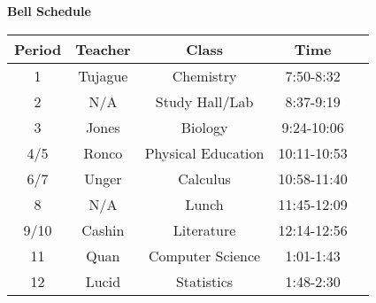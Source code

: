 \documentclass[44pt]{article}
\begin{document}
\begin{center}
    \Huge \textbf{Bell Schedule}
\end{center}

\begin{center}
    \begin{tabular}{ ||c|c|c|c|c|| } 
        \hline
        \hline
        \Huge \textbf{Period} & \Huge \textbf{Teacher} & \Huge \textbf{Class} & \Huge \textbf{Time} \\ 
        \hline
        \hline
        \Huge 1 & \Huge Tujague & \Huge Chemistry & \Huge 7:50-8:32 \\ 
        \hline
        \Huge 2 & \Huge N/A & \Huge Study Hall/Lab & \Huge 8:37-9:19 \\
        \hline
        \Huge 3 & \Huge Jones & \Huge Biology & \Huge 9:24-10:06 \\
        \hline
        \Huge 4/5 & \Huge Ronco & \Huge Physical Education & \Huge 10:11-10:53 \\
        \hline
        \Huge 6/7 & \Huge Unger & \Huge Calculus & \Huge 10:58-11:40 \\
        \hline
        \Huge 8 & \Huge N/A & \Huge Lunch & \Huge 11:45-12:09 \\
        \hline
        \Huge 9/10 & \Huge Cashin & \Huge Literature & \Huge 12:14-12:56 \\
        \hline
        \Huge 11 & \Huge Quan & \Huge Computer Science & \Huge 1:01-1:43\\
        \hline
        \Huge 12 & \Huge Lucid & \Huge Statistics & \Huge 1:48-2:30\\      
        \hline
        \hline
    \end{tabular}
\end{center}
\end{document}
